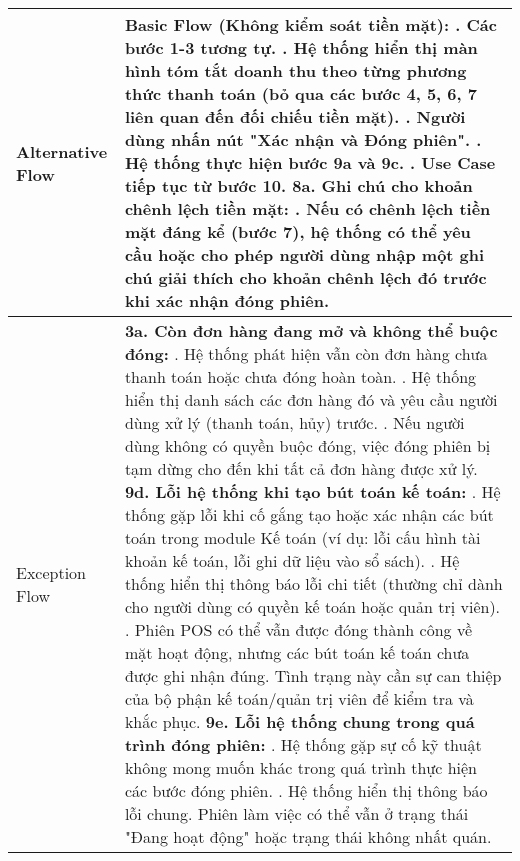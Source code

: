 \begin{longtable}{|m{4cm}|p{11cm}|}
\hline
Alternative Flow & \textbf{Basic Flow (Không kiểm soát tiền mặt):} \newline    1. Các bước 1-3 tương tự. \newline    2. Hệ thống hiển thị màn hình tóm tắt doanh thu theo từng phương thức thanh toán (bỏ qua các bước 4, 5, 6, 7 liên quan đến đối chiếu tiền mặt). \newline    3. Người dùng nhấn nút "Xác nhận và Đóng phiên". \newline    4. Hệ thống thực hiện bước 9a và 9c. \newline    5. Use Case tiếp tục từ bước 10. \newline \textbf{8a. Ghi chú cho khoản chênh lệch tiền mặt:} \newline    1. Nếu có chênh lệch tiền mặt đáng kể (bước 7), hệ thống có thể yêu cầu hoặc cho phép người dùng nhập một ghi chú giải thích cho khoản chênh lệch đó trước khi xác nhận đóng phiên. \\
\hline
Exception Flow & \textbf{3a. Còn đơn hàng đang mở và không thể buộc đóng:} \newline    1. Hệ thống phát hiện vẫn còn đơn hàng chưa thanh toán hoặc chưa đóng hoàn toàn. \newline    2. Hệ thống hiển thị danh sách các đơn hàng đó và yêu cầu người dùng xử lý (thanh toán, hủy) trước. \newline    3. Nếu người dùng không có quyền buộc đóng, việc đóng phiên bị tạm dừng cho đến khi tất cả đơn hàng được xử lý. \newline \textbf{9d. Lỗi hệ thống khi tạo bút toán kế toán:} \newline    1. Hệ thống gặp lỗi khi cố gắng tạo hoặc xác nhận các bút toán trong module Kế toán (ví dụ: lỗi cấu hình tài khoản kế toán, lỗi ghi dữ liệu vào sổ sách). \newline    2. Hệ thống hiển thị thông báo lỗi chi tiết (thường chỉ dành cho người dùng có quyền kế toán hoặc quản trị viên). \newline    3. Phiên POS có thể vẫn được đóng thành công về mặt hoạt động, nhưng các bút toán kế toán chưa được ghi nhận đúng. Tình trạng này cần sự can thiệp của bộ phận kế toán/quản trị viên để kiểm tra và khắc phục. \newline \textbf{9e. Lỗi hệ thống chung trong quá trình đóng phiên:} \newline    1. Hệ thống gặp sự cố kỹ thuật không mong muốn khác trong quá trình thực hiện các bước đóng phiên. \newline    2. Hệ thống hiển thị thông báo lỗi chung. Phiên làm việc có thể vẫn ở trạng thái "Đang hoạt động" hoặc trạng thái không nhất quán. \\

\end{longtable}

